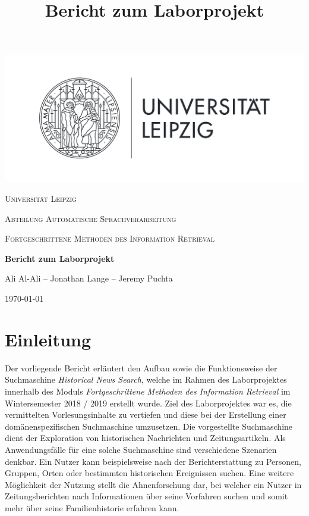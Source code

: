 \documentclass[11pt,a4paper, halfparskip]{scrartcl}
\title{Bericht zum Laborprojekt}
\author{Ali Al-Ali \and Jonathan Lange \and Jeremy Puchta \and }
\begin{document}
\begin{titlepage}
	\centering
	\includegraphics[width=1\textwidth]{Unilogo}\par\vspace{1cm}
	{\scshape\LARGE Universität Leipzig \par}
	\vspace{0.5cm}
	{\scshape\Large Abteilung Automatische Sprachverarbeitung\par}
	\vspace{0.2cm}
	{\scshape\large Fortgeschrittene Methoden des Information Retrieval\par}
	\vspace{1cm}
	{\huge\bfseries Bericht zum Laborprojekt\par}
	\vspace{1cm}
	{\Large Ali Al-Ali -- Jonathan Lange -- Jeremy Puchta \par}

	\vfill
	
	{\large \today\par}
\end{titlepage}

\newpage

\thispagestyle{empty}
\tableofcontents

\newpage
{}
\section{Einleitung}

Der vorliegende Bericht erläutert den Aufbau sowie die Funktionsweise der Suchmaschine \textit{Historical News Search}, welche im Rahmen des Laborprojektes innerhalb des Moduls \textit{Fortgeschrittene Methoden des Information Retrieval} im Wintersemester 2018 / 2019 erstellt wurde. 
Ziel des Laborprojektes war es, die vermittelten Vorlesungsinhalte zu vertiefen und diese bei der Erstellung einer domänenspezifischen Suchmaschine umzusetzen. 
Die vorgestellte Suchmaschine dient der Exploration von historischen Nachrichten und Zeitungsartikeln.
Als Anwendungsfälle für eine solche Suchmaschine sind verschiedene Szenarien denkbar. 
Ein Nutzer kann beispielsweise nach der Berichterstattung zu Personen, Gruppen, Orten oder bestimmten historischen Ereignissen suchen.
Eine weitere Möglichkeit der Nutzung stellt die Ahnenforschung dar, bei welcher ein Nutzer in Zeitungsberichten nach Informationen über seine Vorfahren suchen und somit mehr über seine Familienhistorie erfahren kann.
\end{document}
